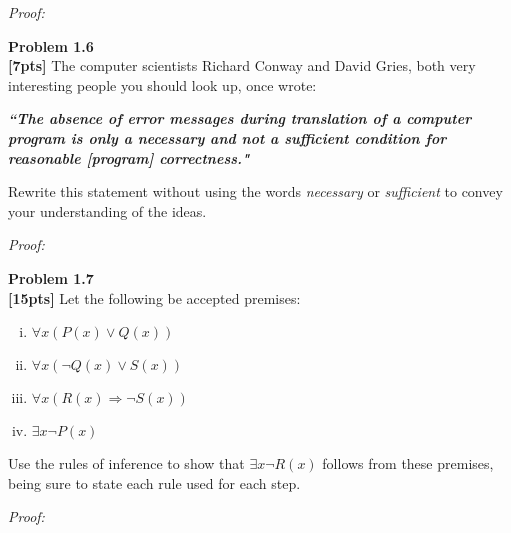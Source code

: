 \documentclass{article}
\newenvironment{problem}[2][Problem]
    { \begin{mdframed}[backgroundcolor=gray!20] \textbf{#1 #2} \\}
    {  \end{mdframed}}
\newenvironment{solution}
    {\textit{Proof:}}
    {}
\begin{document}
\begin{solution}
\end{solution}
\newpage %

\begin{problem}{1.6}
\textbf{[7pts]} The computer scientists Richard Conway and David Gries, both very interesting people you should look up, once wrote: 

\textit{\textbf{``The absence of error messages during translation of a computer program is only a necessary and not a sufficient condition for reasonable [program] correctness."}}

Rewrite this statement without using the words \textit{necessary} or \textit{sufficient} to convey your understanding of the ideas.
\end{problem}
\begin{solution}
\end{solution}
\vspace{2in} %

\begin{problem}{1.7}
\textbf{[15pts]} Let the following be accepted premises:
\begin{enumerate}[i.]
\item $\forall x (P(x) \lor Q(x))$
\item $\forall x (\neg Q(x) \lor S(x))$
\item $\forall x(R(x) \Rightarrow \neg S(x))$
\item $\exists x \neg P(x)$
\end{enumerate}
Use the rules of inference to show that $\exists x \neg R(x)$ follows from these premises, being sure to state each rule used for each step. 
\end{problem}

\begin{solution}
\end{solution}
\newpage %
\end{document}
